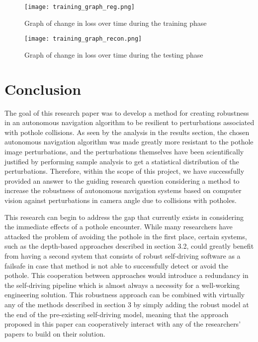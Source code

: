 \documentclass{article}
\begin{document}
\begin{figure}[h]
    \centering
    \texttt{[image: training\_graph\_reg.png]}
    \label{fig:traingraph}
    \caption{Graph of change in loss over time during the training phase}
\end{figure}
\begin{figure}[h]
    \centering
    \texttt{[image: training\_graph\_recon.png]}
    \label{fig:testgraph}
    \caption{Graph of change in loss over time during the testing phase}
\end{figure}

\newpage

\section{Conclusion}

The goal of this research paper was to develop a method for creating robustness in an autonomous navigation algorithm to be resilient to perturbations associated with pothole collisions. As seen by the analysis in the results section, the chosen autonomous navigation algorithm was made greatly more resistant to the pothole image perturbations, and the perturbations themselves have been scientifically justified by performing sample analysis to get a statistical distribution of the perturbations. Therefore, within the scope of this project, we have successfully provided an answer to the guiding research question considering a method to increase the robustness of autonomous navigation systems based on computer vision against perturbations in camera angle due to collisions with potholes.

This research can begin to address the gap that currently exists in considering the immediate effects of a pothole encounter. While many researchers have attacked the problem of avoiding the pothole in the first place, certain systems, such as the depth-based approaches described in section 3.2, could greatly benefit from having a second system that consists of robust self-driving software as a failsafe in case that method is not able to successfully detect or avoid the pothole. This cooperation between approaches would introduce a redundancy in the self-driving pipeline which is almost always a necessity for a well-working engineering solution. This robustness approach can be combined with virtually any of the methods described in section 3 by simply adding the robust model at the end of the pre-existing self-driving model, meaning that the approach proposed in this paper can cooperatively interact with any of the researchers' papers to build on their solution.
\end{document}

